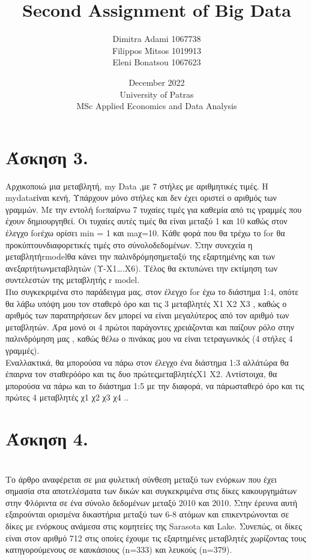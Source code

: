 \documentclass{article}
\title{Second Assignment of Big Data}
\author{Dimitra Adami 1067738\\
	Filippos Mitsos 1019913\\
	Eleni Bonatsou 1067623}
\date{December 2022\\
	University of Patras\\
	MSc Applied Economics and Data Analysis}
\begin{document}
	
	\maketitle
	\newpage
	\tableofcontents
	\appendix
	
	\newpage
	\section{Άσκηση 3.}
	
	
	Αρχικοποιώ μια μεταβλητή, my Data ,με 7 στήλες με αριθμητικές τιμές. Η mydataείναι κενή, Υπάρχουν μόνο στήλες και δεν έχει οριστεί ο αριθμός των γραμμών. Με την  εντολή forπαίρνω 7 τυχαίες τιμές για καθεμία από τις γραμμές που έχουν δημιουργηθεί. Οι τυχαίες αυτές τιμές θα είναι μεταξύ 1 και 10 καθώς στον έλεγχο forέχω ορίσει min = 1 και maχ=10. Κάθε φορά που θα τρέχω το for θα προκύπτουνδιαφορετικές τιμές στο σύνολοδεδομένων. Στην συνεχεία η μεταβλητήrmodelθα κάνει την παλινδρόμησημεταξύ της εξαρτημένης και των ανεξαρτήτωνμεταβλητών (Υ-Χ1….Χ6). Τέλος θα εκτυπώνει την εκτίμηση των συντελεστών της μεταβλητής r model.\\
	
	Πιο συγκεκριμένα στο παράδειγμα μας, στον έλεγχο for έχω το διάστημα 1:4, οπότε θα λάβω υπόψη μου τον σταθερό όρο και τις 3 μεταβλητές Χ1 Χ2 Χ3 , καθώς ο αριθμός των παρατηρήσεων δεν μπορεί να είναι μεγαλύτερος από τον αριθμό των μεταβλητών. Άρα μονό οι 4 πρώτοι παράγοντες χρειάζονται και παίζουν ρόλο στην παλινδρόμηση μας , καθώς θέλω ο πινάκας μου να είναι τετραγωνικός (4 στήλες 4 γραμμές).\\
	
	Εναλλακτικά, θα μπορούσα να πάρω στον έλεγχο ένα διάστημα  1:3 αλλάτώρα θα έπαιρνα τον σταθερόόρο και τις δυο πρώτεςμεταβλητέςΧ1 Χ2. Αντίστοιχα, θα μπορούσα να πάρω και το διάστημα 1:5 με την διαφορά, να πάρωσταθερό όρο και τις πρώτες 4 μεταβλητές χ1 χ2 χ3 χ4 ..\\
	
	\newpage
	
	\section{Άσκηση 4.} \\
	Το άρθρο αναφέρεται σε μια φυλετική σύνθεση μεταξύ των ενόρκων που έχει σημασία στα αποτελέσματα των δικών και συγκεκριμένα στις δίκες κακουργημάτων στην Φλόριντα σε ένα σύνολο δεδομένων μεταξύ 2010 και 2010. Στην έρευνα αυτή εξαιρούνται ορισμένα δικαστήρια μεταξύ των 6-8 ατόμων και επικεντρώνονται σε δίκες με ενόρκους ανάμεσα στις κομητείες της Sarasota και Lake. Συνεπώς, οι δίκες είναι στον αριθμό 712 στις οποίες έχουμε τις εξαρτημένες μεταβλητές χωρίζοντας τους κατηγορούμενους σε καυκάσιους (n=333) και λευκούς (n=379).\\
	
\end{document}
